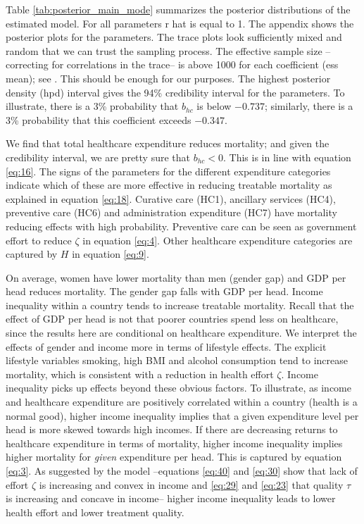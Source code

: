 \documentclass[a4paper,12pt]{article}
\begin{document}
Table \ref{tab:posterior_main_mode} summarizes the posterior distributions of the estimated model. For all parameters r hat is equal to 1. The appendix shows the posterior plots for the parameters. The trace plots look sufficiently mixed and random that we can trust the sampling process. The effective sample size --correcting for correlations in the trace-- is above 1000 for each coefficient (ess mean); see \cite{GelmanBook}. This should be enough for our purposes. The highest posterior density (hpd) interval gives the 94\% credibility interval for the parameters. To illustrate, there is a 3\% probability that \(b_{hc}\) is below \(-0.737\); similarly, there is a 3\% probability that this coefficient exceeds \(-0.347\).

We find that total healthcare expenditure reduces mortality; and given the credibility interval, we are pretty sure that \(b_{hc} < 0\). This is in line with equation \eqref{eq:16}. The signs of the parameters for the different expenditure categories indicate which of these are more effective in reducing treatable mortality as explained in equation \eqref{eq:18}. Curative care (HC1), ancillary services (HC4), preventive care (HC6) and administration expenditure (HC7) have mortality reducing effects with high probability. Preventive care can be seen as government effort to reduce \(\zeta\) in equation \eqref{eq:4}. Other healthcare expenditure categories are captured by \(H\) in equation \eqref{eq:9}.

On average, women have lower mortality than men (gender gap) and GDP per head reduces mortality. The gender gap falls with GDP per head. Income inequality within a country tends to increase treatable mortality. Recall that the effect of GDP per head is not that poorer countries spend less on healthcare, since the results here are conditional on healthcare expenditure. We interpret the effects of gender and income more in terms of lifestyle effects. The explicit lifestyle variables smoking, high BMI and alcohol consumption tend to increase mortality, which is consistent with a reduction in health effort \(\zeta\). Income inequality picks up effects beyond these obvious factors. To illustrate, as income and healthcare expenditure are positively correlated within a country (health is a normal good), higher income inequality implies that a given expenditure level per head is more skewed towards high incomes. If there are decreasing returns to healthcare expenditure in terms of mortality, higher income inequality implies higher mortality for \emph{given} expenditure per head. This is captured by equation \eqref{eq:3}. As suggested by the model  --equations \eqref{eq:40} and \eqref{eq:30} show that lack of effort \(\zeta\) is increasing and convex in income and \eqref{eq:29}  and \eqref{eq:23} that quality \(\tau\) is increasing and concave in income-- higher income inequality leads to lower health effort and lower treatment quality.
\end{document}
